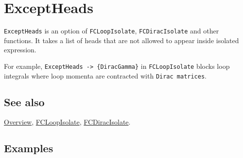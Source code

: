 \documentclass[../FeynCalcManual.tex]{subfiles}
\begin{document}
\hypertarget{exceptheads}{
\section{ExceptHeads}\label{exceptheads}}

\texttt{ExceptHeads} is an option of \texttt{FCLoopIsolate},
\texttt{FCDiracIsolate} and other functions. It takes a list of heads
that are not allowed to appear inside isolated expression.

For example, \texttt{ExceptHeads -> \{\allowbreak{}DiracGamma\}} in
\texttt{FCLoopIsolate} blocks loop integrals where loop momenta are
contracted with \texttt{Dirac matrices}.

\subsection{See also}

\hyperlink{toc}{Overview}, \hyperlink{fcloopisolate}{FCLoopIsolate},
\hyperlink{fcdiracisolate}{FCDiracIsolate}.

\subsection{Examples}
\end{document}
